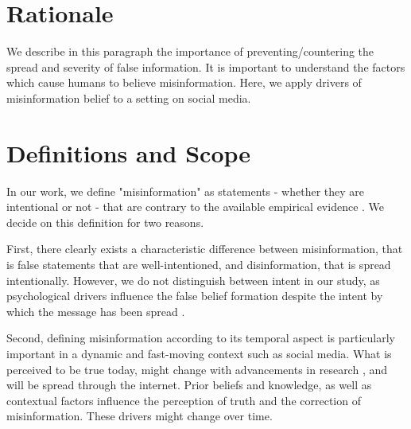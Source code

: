 \documentclass[
10pt, %
a4paper, %
oneside, %
headinclude,footinclude, %
] {book}%
\begin{document}
\section{Rationale}

We describe in this paragraph the importance of preventing/countering the spread and severity of false information. 
It is important to understand the factors which cause humans to believe misinformation. Here, we apply drivers of misinformation belief to a setting on social media.






\section{Definitions and Scope}

In our work, we define "misinformation" as statements - whether they are intentional or not - that are contrary to the available empirical evidence \citep{doi:10.1177/14614448211011451}. We decide on this definition for two reasons.

First, there clearly exists a characteristic difference between misinformation, that is false statements that are well-intentioned, and disinformation, that is spread intentionally. However, we do not distinguish between intent in our study, as psychological drivers influence the false belief formation despite the intent by which the message has been spread \citep{psychological_drivers_misinformation}.

Second, defining misinformation according to its temporal aspect is particularly important in a dynamic and fast-moving context such as social media. What is perceived to be true today, might change with advancements in research \citep{doi:10.1177/14614448211011451}, and will be spread through the internet. Prior beliefs and knowledge, as well as contextual factors  influence the perception of truth and the correction of misinformation. These drivers might change over time.
\end{document}
